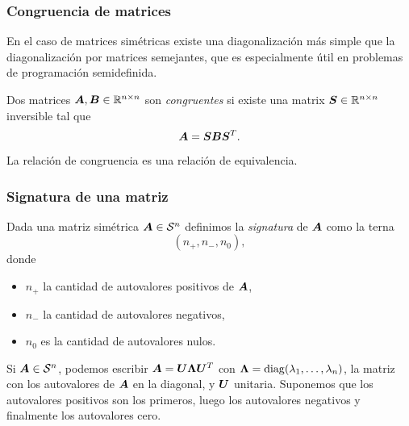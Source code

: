 \documentclass[aspectratio=169,12pt,spanish]{beamer}
\begin{document}
\begin{frame}
\frametitle{Congruencia de matrices}

En el caso de matrices simétricas existe una diagonalización más simple que la diagonalización por matrices semejantes, que es especialmente útil en problemas de programación semidefinida.

\begin{definition}
Dos matrices $\bm{A}, \bm{B} \in \mathbb{R}^{n\times n}$ son \emph{congruentes} si existe una matrix $\bm{S} \in \mathbb{R}^{n\times n}$ inversible tal que
$$
\bm{A} = \bm{S} \bm{B} \bm{S}^T.
$$
\end{definition}

La relación de congruencia es una relación de equivalencia.

\end{frame}


\begin{frame}
\frametitle{Signatura de una matriz}

Dada una matriz simétrica $\bm{A} \in {\mathcal S^n}$ definimos la \emph{signatura} de $\bm{A}$ como la terna 
$$(n_+, n_-, n_0),$$
donde 
\begin{itemize}
\item $n_+$ la cantidad de autovalores positivos de $\bm{A}$, 
\item $n_-$ la cantidad de autovalores negativos, 
\item $n_0$ es la cantidad de autovalores nulos.
\end{itemize}

Si $\bm{A} \in {\mathcal S^n}$, podemos escribir $\bm{A} = \bm{U} \bm{\Lambda} \bm{U}^T$ con $\bm{\Lambda} =  \operatorname{diag}(\lambda_1, \dots, \lambda_n)$, la matriz con los autovalores de $\bm{A}$ en la diagonal, y $\bm{U}$ unitaria. Suponemos que los autovalores positivos son los primeros, luego los autovalores negativos y finalmente los autovalores cero.


\end{frame}

\end{document}
